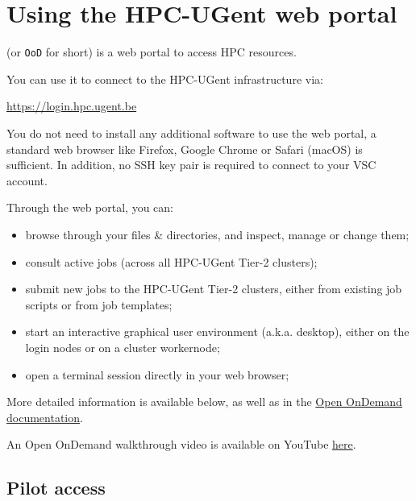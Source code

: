 \chapter{Using the HPC-UGent web portal}
\label{ch:web_portal}

\href{https://openondemand.org/}{} (or \texttt{OoD} for short)
is a web portal to access HPC resources.

You can use it to connect to the HPC-UGent infrastructure via:

\begin{center}\url{https://login.hpc.ugent.be}\end{center}

You do not need to install any additional software to use the web portal, a standard web browser like Firefox,
Google Chrome or Safari (macOS) is sufficient. In addition, no SSH key pair is required to connect
to your VSC account.

Through the web portal, you can:
\begin{itemize}
    \item browse through your files \& directories, and inspect, manage or change them;
    \item consult active jobs (across all HPC-UGent Tier-2 clusters);
    \item submit new jobs to the HPC-UGent Tier-2 clusters, either from existing job scripts or from job templates;
    \item start an interactive graphical user environment (a.k.a. desktop), either on the login nodes or on a cluster workernode;
    \item open a terminal session directly in your web browser;
\end{itemize}

More detailed information is available below, as well as in the \href{https://osc.github.io/ood-documentation/master/}{Open OnDemand documentation}.

An Open OnDemand walkthrough video is available on YouTube \href{https://www.youtube.com/watch?v=4-w-4wjlnPk}{here}.

\section*{Pilot access}


